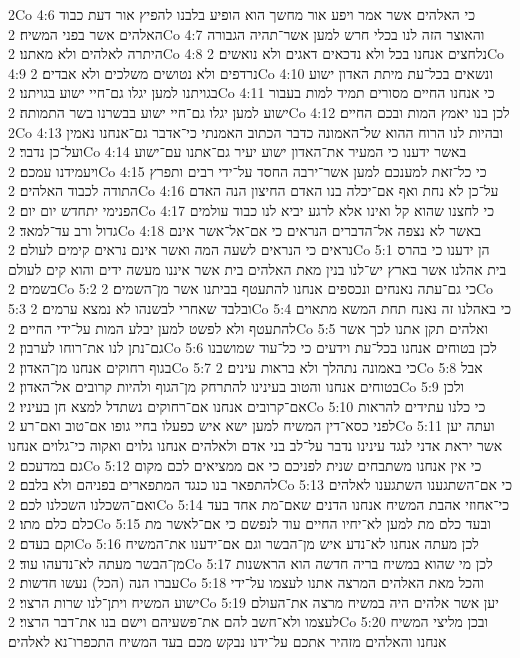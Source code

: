 2Co 4:6  כי האלהים אשר אמר ויפע אור מחשך הוא הופיע בלבנו להפיץ אור דעת כבוד האלהים אשר בפני המשיח׃
2Co 4:7  והאוצר הזה לנו בכלי חרש למען אשר־תהיה הגבורה היתרה לאלהים ולא מאתנו׃
2Co 4:8  נלחצים אנחנו בכל ולא נדכאים דאגים ולא נואשים׃
2Co 4:9  נרדפים ולא נטושים משלכים ולא אבדים׃
2Co 4:10  ונשאים בכל־עת מיתת האדון ישוע בגויתנו למען יגלו גם־חיי ישוע בגויתנו׃
2Co 4:11  כי אנחנו החיים מסורים תמיד למות בעבור ישוע למען יגלו גם־חיי ישוע בבשרנו בשר התמותה׃
2Co 4:12  לכן בנו יאמץ המות ובכם החיים׃
2Co 4:13  ובהיות לנו הרוח ההוא של־האמונה כדבר הכתוב האמנתי כי־אדבר גם־אנחנו נאמין ועל־כן נדבר׃
2Co 4:14  באשר ידענו כי המעיר את־האדון ישוע יעיר גם־אתנו עם־ישוע ויעמידנו עמכם׃
2Co 4:15  כי כל־זאת למענכם למען אשר־ירבה החסד על־ידי רבים ותפרץ התודה לכבוד האלהים׃
2Co 4:16  על־כן לא נחת ואף אם־יכלה בנו האדם החיצון הנה האדם הפנימי יתחדש יום יום׃
2Co 4:17  כי לחצנו שהוא קל ואינו אלא לרגע יביא לנו כבוד עולמים גדול ורב עד־למאד׃
2Co 4:18  באשר לא נצפה אל־הדברים הנראים כי אם־אל־אשר אינם נראים כי הנראים לשעה המה ואשר אינם נראים קימים לעולם׃
2Co 5:1  הן ידענו כי בהרס בית אהלנו אשר בארץ יש־לנו בנין מאת האלהים בית אשר איננו מעשה ידים והוא קים לעולם בשמים׃
2Co 5:2  כי גם־עתה נאנחים ונכספים אנחנו להתעטף בביתנו אשר מן־השמים׃
2Co 5:3  ובלבד שאחרי לבשנהו לא נמצא ערמים׃
2Co 5:4  כי באהלנו זה נאנח תחת המשא מתאוים להתעטף ולא לפשט למען יבלע המות על־ידי החיים׃
2Co 5:5  ואלהים תקן אתנו לכך אשר גם־נתן לנו את־רוחו לערבון׃
2Co 5:6  לכן בטוחים אנחנו בכל־עת וידעים כי כל־עוד שמושבנו בגוף רחוקים אנחנו מן־האדון׃
2Co 5:7  כי באמונה נתהלך ולא בראות עינים׃
2Co 5:8  אבל בטוחים אנחנו והטוב בעינינו להתרחק מן־הגוף ולהיות קרובים אל־האדון׃
2Co 5:9  ולכן אם־קרובים אנחנו אם־רחוקים נשתדל למצא חן בעיניו׃
2Co 5:10  כי כלנו עתידים להראות לפני כסא־דין המשיח למען ישא איש כפעלו בחיי גופו אם־טוב ואם־רע׃
2Co 5:11  ועתה יען אשר יראת אדני לנגד עינינו נדבר על־לב בני אדם ולאלהים אנחנו גלוים ואקוה כי־גלוים אנחנו גם במדעכם׃
2Co 5:12  כי אין אנחנו משתבחים שנית לפניכם כי אם ממציאים לכם מקום להתפאר בנו כנגד המתפארים בפניהם ולא בלבם׃
2Co 5:13  כי אם־השתגענו השתגענו לאלהים ואם־השכלנו השכלנו לכם׃
2Co 5:14  כי־אחוזי אהבת המשיח אנחנו הדנים שאם־מת אחד בעד כלם כלם מתו׃
2Co 5:15  ובעד כלם מת למען לא־יחיו החיים עוד לנפשם כי אם־לאשר מת וקם בעדם׃
2Co 5:16  לכן מעתה אנחנו לא־נדע איש מן־הבשר וגם אם־ידענו את־המשיח מן־הבשר מעתה לא־נדעהו עוד׃
2Co 5:17  לכן מי שהוא במשיח בריה חדשה הוא הראשנות עברו הנה (הכל) נעשו חדשות׃
2Co 5:18  והכל מאת האלהים המרצה אתנו לעצמו על־ידי ישוע המשיח ויתן־לנו שרות הרצוי׃
2Co 5:19  יען אשר אלהים היה במשיח מרצה את־העולם לעצמו ולא־חשב להם את־פשעיהם וישם בנו את־דבר הרצוי׃
2Co 5:20  ובכן מליצי המשיח אנחנו והאלהים מזהיר אתכם על־ידנו נבקש מכם בעד המשיח התכפרו־נא לאלהים׃

